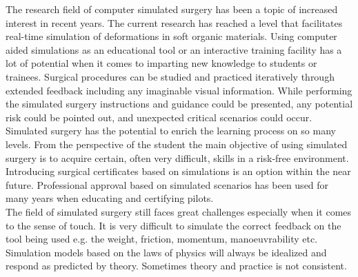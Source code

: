 

The research field of computer simulated surgery has been a
topic of increased interest in recent years.
%
The current research has reached a level that facilitates
real-time simulation of deformations in soft organic materials. 
Using computer aided simulations as an educational
tool or an interactive training facility has a lot of potential when
it comes to imparting new knowledge to students or
trainees. Surgical procedures can be studied and practiced iteratively
through extended feedback including any imaginable visual
information. While performing the simulated surgery instructions and
guidance could be presented, any potential risk could be pointed out,
and unexpected critical scenarios could occur. 
Simulated surgery has the potential to enrich the
learning process on so many levels.  
%
From the perspective of
the student the main objective of using simulated surgery is to
acquire certain, often very difficult, skills in a risk-free
environment. Introducing surgical certificates based
on simulations is an option within the near future. Professional approval
based on simulated scenarios has been used for many years when
educating and certifying pilots. \\

The field of simulated surgery still faces great
challenges especially when it comes to the sense of touch. It is
very difficult to simulate the correct feedback on the tool being
used e.g. the weight, friction, momentum, manoeuvrability
etc. Simulation models based on the laws of physics will
always be idealized and respond as predicted by theory. Sometimes
theory and practice is not consistent. \\
%

